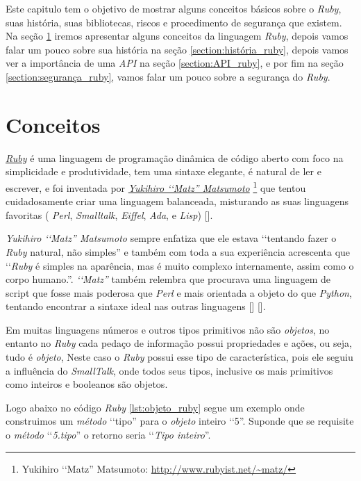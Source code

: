 Este capitulo tem o objetivo de mostrar alguns conceitos básicos sobre o \emph{Ruby}, suas
história, suas bibliotecas, riscos e procedimento de segurança que existem.
Na seção \ref{section:conceitos_ruby} iremos apresentar alguns conceitos da linguagem \emph{Ruby},
depois vamos falar um pouco sobre sua história na seção \ref{section:história_ruby}, depois vamos ver
a importância de uma \emph{API} na seção \ref{section:API_ruby}, e por fim na seção
\ref{section:segurança_ruby}, vamos falar um pouco sobre a segurança do \emph{Ruby}.

\section{Conceitos}
\label{section:conceitos_ruby}

\emph{\href{https://www.ruby-lang.org/en/}{Ruby}} é uma linguagem de programação
dinâmica de código aberto com foco na simplicidade e produtividade, tem uma sintaxe elegante, é natural de
ler e escrever, e foi inventada por \emph{ \href{http://www.rubyist.net/~matz/}{Yukihiro ‘‘Matz'' Matsumoto}}
\footnote{Yukihiro ‘‘Matz'' Matsumoto: \url{http://www.rubyist.net/~matz/}}
que tentou cuidadosamente criar uma linguagem balanceada, misturando as suas linguagens favoritas
( \emph{Perl}, \emph{Smalltalk}, \emph{Eiffel}, \emph{Ada}, e \emph{Lisp}) [].

\emph{{Yukihiro ‘‘Matz'' Matsumoto}} sempre enfatiza que ele estava ‘‘tentando fazer o \emph{Ruby} natural, não simples'' e também com toda a
sua experiência acrescenta que ‘‘\emph{Ruby} é simples na aparência, mas é muito complexo internamente, assim
como o corpo humano.''. \emph{‘‘Matz''} também relembra que procurava uma linguagem de script que fosse mais
poderosa que \emph{Perl} e mais orientada a objeto do que \emph{Python}, tentando encontrar a
sintaxe ideal nas outras linguagens [] [].

Em muitas linguagens números e outros tipos primitivos não são \emph{objetos}, no entanto no \emph{Ruby}
cada pedaço de informação possui propriedades e ações, ou seja, tudo é \emph{objeto}, Neste caso o
\emph{Ruby} possui esse tipo de característica, pois ele seguiu a influência do \emph{SmallTalk}, onde
todos seus tipos, inclusive os mais primitivos como inteiros e booleanos são objetos.

Logo abaixo no código \emph{Ruby} \ref{lst:objeto_ruby} segue um
exemplo onde construimos um \emph{método} ‘‘tipo'' para o \emph{objeto} inteiro ‘‘5''. Suponde que se
requisite o \emph{método} ‘‘\emph{5.tipo}'' o retorno seria ‘‘\emph{Tipo inteiro}''.

